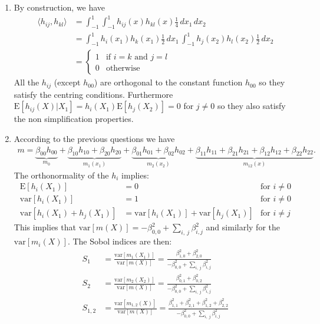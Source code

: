 \documentclass[a4paper,10pt]{article}
\newcommand{\var}{\mbox{var}}
\newcommand{\E}{\mbox{E}}
\begin{document}
\begin{enumerate}[label=Q\arabic*.]
\item By construction, we have
\begin{align*}
	\langle h_{ij}, h_{kl} \rangle 
	&= \int_{-1}^1 \int_{-1}^1 h_{ij}(x) h_{kl}(x) \frac14 \, dx_1 \, dx_2 \\
	&= \int_{-1}^1 h_{i}(x_1) h_{k}(x_1) \frac12 \, dx_1 \, \int_{-1}^1 h_{j}(x_2) h_{l}(x_2) \frac12 \, dx_2 \\ 
	&= 
	\begin{cases}
		1 & \text{if } i=k \text{ and } j=l\\
		0 & \text{otherwise}
	\end{cases}
\end{align*}
All the $h_{ij}$ (except $h_{00}$) are orthogonal to the constant function $h_{00}$ so they satisfy the centring conditions. Furthermore $\E [h_{ij}(X)|X_1]=  h_{i}(X_1) \E [h_{j}(X_2)]=0$ for $j \neq 0$ so they also satisfy the non simplification properties.
\item According to the previous questions we have
\begin{align*}
	m = 
	\underbrace{\beta_{00} h_{00}}_{m_0} +
	\underbrace{\beta_{10} h_{10} + \beta_{20} h_{20}}_{m_1(x_1)} + 
	\underbrace{\beta_{01} h_{01} + \beta_{02} h_{02}}_{m_2(x_2)} +
	\underbrace{\beta_{11} h_{11} + \beta_{21} h_{21} + \beta_{12} h_{12} + \beta_{22} h_{22}}_{m_{12}(x)}.
\end{align*}
The orthonormality of the $h_i$ implies:
\begin{align*}
	\E [h_i(X_1)] &=0 &\text{for } i \neq 0\\
	\var [h_i(X_1)] &=1 &\text{for } i \neq 0\\
	\var [h_i(X_1) + h_j(X_1)] &= \var [h_i(X_1)] + \var [h_j(X_1)] &\text{for } i \neq j
\end{align*}
This implies that $\var [m(X)] = -\beta_{0,0}^2 + \sum_{i,\ j} \beta_{i,j}^2$ and similarly for the $\var [m_i(X)]$. The Sobol indices are then:
\begin{align*}
	S_1 &= \frac{\var [m_1(X_1)]}{\var [m(X)]} = \frac{\beta_{1,0}^2 + \beta_{2,0}^2 }{-\beta_{0,0}^2 + \sum_{i,\ j} \beta_{i,j}^2} \\
	S_2 &= \frac{\var [m_2(X_2)]}{\var [m(X)]} = \frac{\beta_{0,1}^2 + \beta_{0,2}^2 }{-\beta_{0,0}^2 + \sum_{i,\ j} \beta_{i,j}^2} \\
	S_{1,2} &= \frac{\var [m_{1,2}(X)]}{\var [m(X)]} = \frac{\beta_{1,1}^2 + \beta_{2,1}^2 + \beta_{1,2}^2 + \beta_{2,2}^2 }{-\beta_{0,0}^2 + \sum_{i,\ j} \beta_{i,j}^2} \\
\end{align*}

\end{enumerate}
\end{document}

